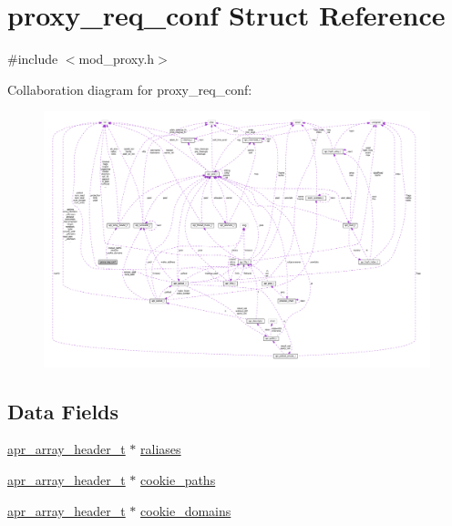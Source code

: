\hypertarget{structproxy__req__conf}{}\section{proxy\+\_\+req\+\_\+conf Struct Reference}
\label{structproxy__req__conf}


{\ttfamily \#include $<$mod\+\_\+proxy.\+h$>$}



Collaboration diagram for proxy\+\_\+req\+\_\+conf\+:
\nopagebreak
\begin{figure}[H]
\begin{center}
\leavevmode
\includegraphics[width=350pt]{structproxy__req__conf__coll__graph}
\end{center}
\end{figure}
\subsection*{Data Fields}
\begin{DoxyCompactItemize}
\item 
\hyperlink{structapr__array__header__t}{apr\+\_\+array\+\_\+header\+\_\+t} $\ast$ \hyperlink{structproxy__req__conf_a2a7db0adc7b6be3b7f280028b6ac19bb}{raliases}
\item 
\hyperlink{structapr__array__header__t}{apr\+\_\+array\+\_\+header\+\_\+t} $\ast$ \hyperlink{structproxy__req__conf_a396539f089759b6c17c2df8edc39241c}{cookie\+\_\+paths}
\item 
\hyperlink{structapr__array__header__t}{apr\+\_\+array\+\_\+header\+\_\+t} $\ast$ \hyperlink{structproxy__req__conf_a24ab71c2e749d3a675c3e25289cf12c9}{cookie\+\_\+domains}
\end{DoxyCompactItemize}


